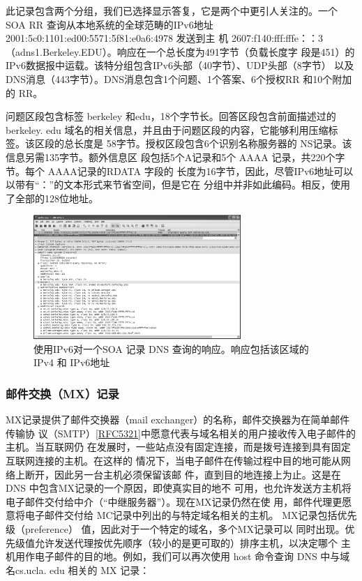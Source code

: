 此记录包含两个分组，我们已选择显示答复，它是两个中更引人关注的。一个 SOA RR
查询从本地系统的全球范畴的IPv6地址2001:5c0:1101:ed00:5571:5f81:e0a6:4978 发送到主
机 2607:f140:fff:fffe：：3 （adns1.Berkeley.EDU）。响应在一个总长度为491字节（负载长度字
段是451）的IPv6数据报中运载。该特分组包含IPv6头部（40字节）、UDP头部（8字节）
以及 DNS消息（443字节）。DNS消息包含1个问题、1个答案、6个授权RR 和10个附加
的 RR。

问题区段包含标签 berkeley 和edu，18个字节长。回答区段包含前面描述过的 berkeley.
edu 域名的相关信息，并且由于问题区段的内容，它能够利用压缩标签。该区段的总长度是
58字节。授权区段包含6个识别名称服务器的 NS记录。该信息另需135字节。额外信息区
段包括5个A记录和5个 AAAA 记录，共220个字节。每个 AAAA记录的RDATA 字段的
长度为16字节，因此，尽管IPv6地址可以以带有“：”的文本形式来节省空间，但是它在
分组中并非如此编码。相反，使用了全部的128位地址。

\begin{figure}[!htb]
    \centering
	\includegraphics[width=0.7\textwidth]{imgs/11/11-14.png}
	\caption{使用IPv6对一个SOA 记录 DNS 查询的响应。响应包括该区域的 IPv4 和 IPv6地址}
\end{figure}

\subsubsection{邮件交换（MX）记录}

MX记录提供了邮件交换器（mail exchanger）的名称，邮件交换器为在简单邮件传输协
议（SMTP）\href{https://www.rfc-editor.org/rfc/rfc5321}{[RFC5321]}中愿意代表与域名相关的用户接收传入电子邮件的主机。当互联网仍
在发展时，一些站点没有固定连接，而是拨号连接到具有固定互联网连接的主机。在这样的
情况下，当电子邮件在传输过程中目的地可能从网络上断开，因此另一台主机必须保留该邮
件，直到目的地连接上为止。这是在 DNS 中包含MX记录的一个原因，即使真实目的地不
可用，也允许发送方主机将电子邮件交付给中介（“中继服务器”）。现在MX记录仍然在使
用，邮件代理更愿意将电子邮件交付给 MC记录中列出的与特定域名相关的主机。
MX记录包括优先级（preference） 值，因此对于一个特定的域名，多个MX记录可以
同时出现。优先级值允许发送代理按优先顺序（较小的是更可取的）排序主机，以决定哪个
主机用作电子邮件的目的地。例如，我们可以再次使用 host 命令查询 DNS 中与域名cs.ucla.
edu 相关的 MX 记录：

